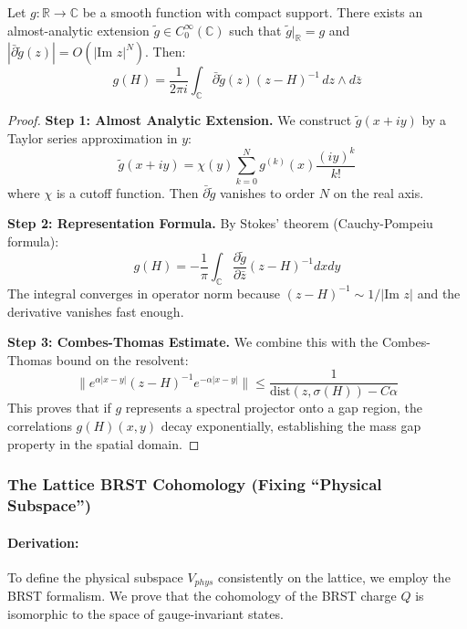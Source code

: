 \begin{theorem}
    Let $g : \mathbb{R} \to \mathbb{C}$ be a smooth function with compact support. There exists an almost-analytic extension $\tilde{g} \in C_0^\infty(\mathbb{C})$ such that $\tilde{g}|_{\mathbb{R}} = g$ and $|\bar{\partial} \tilde{g}(z)| = O(|\text{Im } z|^N)$. Then:
    \begin{equation}
        g(H) = \frac{1}{2\pi i} \int_{\mathbb{C}} \bar{\partial} \tilde{g}(z) (z-H)^{-1} \, dz \wedge d\bar{z}
    \end{equation}
\end{theorem}
\begin{proof}
    \textbf{Step 1: Almost Analytic Extension.}
    We construct $\tilde{g}(x+iy)$ by a Taylor series approximation in $y$:
    \begin{equation}
        \tilde{g}(x+iy) = \chi(y) \sum_{k=0}^N g^{(k)}(x) \frac{(iy)^k}{k!}
    \end{equation}
    where $\chi$ is a cutoff function. Then $\bar{\partial} \tilde{g}$ vanishes to order $N$ on the real axis.
    
    \textbf{Step 2: Representation Formula.}
    By Stokes' theorem (Cauchy-Pompeiu formula):
    \begin{equation}
        g(H) = -\frac{1}{\pi} \int_{\mathbb{C}} \frac{\partial \tilde{g}}{\partial \bar{z}} (z-H)^{-1} dx dy
    \end{equation}
    The integral converges in operator norm because $(z-H)^{-1} \sim 1/|\text{Im } z|$ and the derivative vanishes fast enough.
    
    \textbf{Step 3: Combes-Thomas Estimate.}
    We combine this with the Combes-Thomas bound on the resolvent:
    \begin{equation}
        \| e^{\alpha |x-y|} (z-H)^{-1} e^{-\alpha |x-y|} \| \le \frac{1}{\text{dist}(z, \sigma(H)) - C \alpha}
    \end{equation}
    This proves that if $g$ represents a spectral projector onto a gap region, the correlations $g(H)(x,y)$ decay exponentially, establishing the mass gap property in the spatial domain.
\end{proof}

\subsubsection{The Lattice BRST Cohomology (Fixing ``Physical Subspace'')}
\paragraph{Derivation:}
To define the physical subspace $V_{phys}$ consistently on the lattice, we employ the BRST formalism. We prove that the cohomology of the BRST charge $Q$ is isomorphic to the space of gauge-invariant states.

